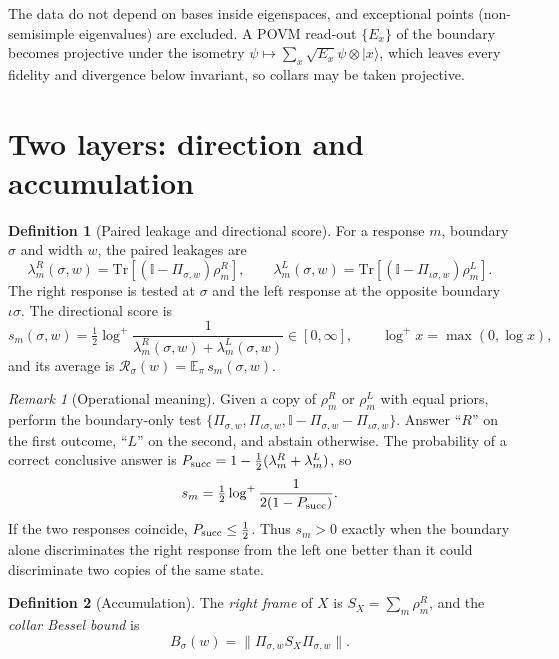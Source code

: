 \documentclass[11pt]{article}
\theoremstyle{definition}
\newtheorem{definition}{Definition}
\theoremstyle{remark}
\newtheorem{remark}{Remark}
\newcommand{\Tr}{\mathrm{Tr}}
\newcommand{\E}{\mathbb{E}}
\newcommand{\one}{\mathbb{I}}
\newcommand{\ket}[1]{|#1\rangle}
\newcommand{\isig}{\iota\sigma}
\begin{document}
The data do not depend on bases inside eigenspaces, and exceptional points (non-semisimple eigenvalues) are excluded. A POVM read-out $\{E_x\}$ of the boundary becomes projective under the isometry $\psi\mapsto\sum_x\sqrt{E_x}\psi\otimes\ket x$, which leaves every fidelity and divergence below invariant, so collars may be taken projective.

\section{Two layers: direction and accumulation}
\label{sec:score}

\begin{definition}[Paired leakage and directional score]\label{def:score}
For a response $m$, boundary $\sigma$ and width $w$, the paired leakages are
\[
\lambda^R_m(\sigma,w)=\Tr[(\one-\Pi_{\sigma,w})\rho^R_m],\qquad
\lambda^L_m(\sigma,w)=\Tr[(\one-\Pi_{\isig,w})\rho^L_m].
\]
The right response is tested at $\sigma$ and the left response at the opposite boundary $\isig$. The directional score is
\[
s_m(\sigma,w)=\tfrac12\log^+\frac{1}{\lambda^R_m(\sigma,w)+\lambda^L_m(\sigma,w)}\in[0,\infty],\qquad \log^+x=\max(0,\log x),
\]
and its average is $\mathcal R_\sigma(w)=\E_\pi\, s_m(\sigma,w)$.
\end{definition}

\begin{remark}[Operational meaning]\label{rem:operational}
Given a copy of $\rho^R_m$ or $\rho^L_m$ with equal priors, perform the boundary-only test $\{\Pi_{\sigma,w},\Pi_{\isig,w},\one-\Pi_{\sigma,w}-\Pi_{\isig,w}\}$. Answer ``$R$'' on the first outcome, ``$L$'' on the second, and abstain otherwise. The probability of a correct conclusive answer is $P_{\rm succ}=1-\frac12(\lambda^R_m+\lambda^L_m)$, so
\[
s_m=\tfrac12\log^+\frac{1}{2(1-P_{\rm succ})}.
\]
If the two responses coincide, $P_{\rm succ}\le\frac12$. Thus $s_m>0$ exactly when the boundary alone discriminates the right response from the left one better than it could discriminate two copies of the same state.
\end{remark}

\begin{definition}[Accumulation]\label{def:acc}
The \emph{right frame} of $X$ is $S_X=\sum_m\rho^R_m$, and the \emph{collar Bessel bound} is
\[
B_\sigma(w)=\bigl\|\Pi_{\sigma,w}S_X\Pi_{\sigma,w}\bigr\| .
\]
\end{definition}
\end{document}
